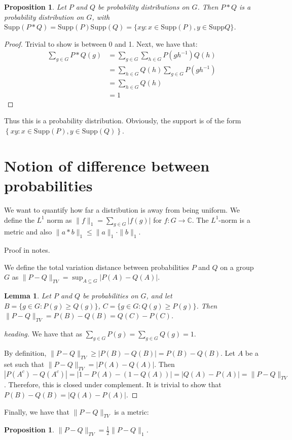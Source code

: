 \documentclass[]{article}
\newtheorem{proposition}[theorem]{Proposition}
\newtheorem{lemma}[theorem]{Lemma}
\theoremstyle{definition}
\numberwithin{theorem}{section}
\numberwithin{equation}{section}
\newcommand{\supp}{\text{Supp}}
\begin{document}
\begin{proposition}
	Let $P$ and $Q$ be probability distributions on $G$. Then $P \ast Q$ is a probability distribution on $G$, with $\supp(P \ast Q) = \supp(P)\supp(Q) = \lbrace xy : x \in \supp(P), y \in \supp Q \rbrace$. 
\end{proposition}
\begin{proof}
	Trivial to show is between 0 and 1.
	Next, we have that:
	\begin{align*}
		\sum_{g \in G} P \ast Q(g) &= \sum_{g \in G} \sum_{h \in G} P(gh^{-1}) Q(h)\\
		&=\sum_{h \in G} Q(h) \sum_{g \in G} P(gh^{-1})\\
		&= \sum_{h \in G} Q(h)\\
		&= 1
	\end{align*}
\end{proof}
Thus this is a probability distribution. Obviously, the support is of the form $\left\{ xy : x \in \supp(P), y \in \supp(Q) \right\}$. 

\section{Notion of difference between probabilities}
We want to quantify how far a distribution is away from being uniform. We define the $L^1$ norm as $\|f\|_1 = \sum_{g \in G} |f(g)|$ for $f : G \rightarrow \mathbb{C}$. The $L^1$-norm is a metric and also $\|a \ast b\|_1 \leq \|a\|_1 \cdot \|b\|_1$. 

Proof in notes.

We define the total variation distance between probabilities $P$ and $Q$ on a group $G$ as $\| P - Q\|_{TV} = \sup_{A \subseteq G} |P(A) - Q(A)|$. 

\begin{lemma}
	Let $P$ and $Q$ be probabilities on $G$, and let $B = \lbrace g \in G : P(g) \geq Q(g) \rbrace$, $C = \lbrace g \in G : Q(g) \geq P(g) \rbrace$.
	Then $\|P - Q \|_{TV} = P(B) - Q(B) = Q(C) - P(C)$.
\end{lemma}
\begin{proof}[heading]
	We have that as $\sum_{g \in G} P(g) = \sum_{g \in G} Q(g) = 1$. 
	
	
	By definition, $\|P - Q\|_{TV} \geq |P(B) - Q(B)| = P(B) - Q(B)$.
	Let $A$ be a set such that $\|P - Q\|_{TV} = |P(A) - Q(A)|.$ Then $|P(A^c) - Q(A^c)| = |1 - P(A) - (1 - Q(A))| = |Q(A) - P(A)| = \|P - Q \|_{TV}$. Therefore, this is closed under complement. It is trivial to show that $P(B) - Q(B) = |Q(A) - P(A)|$. 
\end{proof}
Finally, we have that $\|P - Q \|_{TV}$ is a metric:
\begin{proposition}
	\label{prop:distribution difference equality}
	$\|P - Q\|_{TV} = \frac{1}{2} \|P - Q \|_1$. 
\end{proposition}
\end{document}
